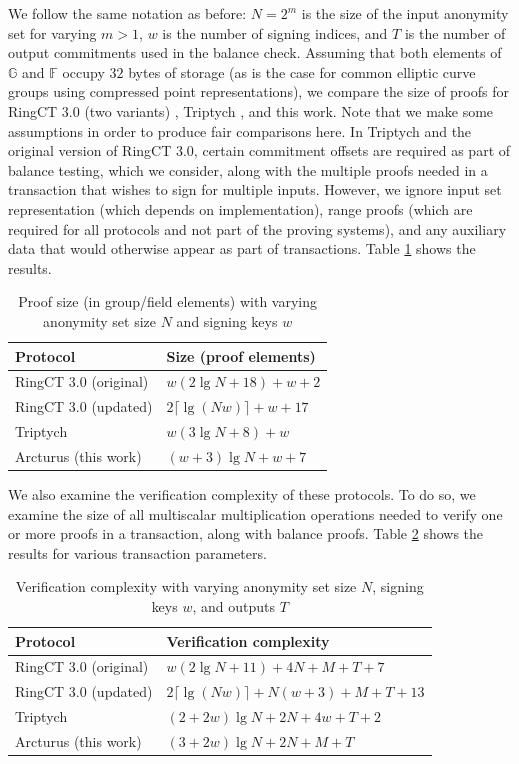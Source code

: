 \documentclass{article}
\newcommand{\G}{\mathbb{G}}
\newcommand{\F}{\mathbb{F}}
\theoremstyle{definition}
\begin{document}
We follow the same notation as before: $N = 2^m$ is the size of the input anonymity set for varying $m > 1$, $w$ is the number of signing indices, and $T$ is the number of output commitments used in the balance check.
Assuming that both elements of $\G$ and $\F$ occupy $32$ bytes of storage (as is the case for common elliptic curve groups using compressed point representations), we compare the size of proofs for RingCT 3.0 (two variants) \cite{rct3}, Triptych \cite{triptych}, and this work.
Note that we make some assumptions in order to produce fair comparisons here.
In Triptych and the original version of RingCT 3.0, certain commitment offsets are required as part of balance testing, which we consider, along with the multiple proofs needed in a transaction that wishes to sign for multiple inputs.
However, we ignore input set representation (which depends on implementation), range proofs (which are required for all protocols and not part of the proving systems), and any auxiliary data that would otherwise appear as part of transactions.
Table \ref{table:size} shows the results.

\begin{table}
\centering
\begin{tabular}{|ll|}
\hline
Protocol & Size (proof elements) \\
\hline
RingCT 3.0 (original) \cite{rct3} & $w(2 \lg N + 18) + w + 2$ \\
RingCT 3.0 (updated) \cite{rct3} & $2\lceil \lg(Nw) \rceil + w + 17$ \\
Triptych \cite{triptych} & $w(3 \lg N + 8) + w$ \\
Arcturus (this work) & $(w + 3)\lg N + w + 7$ \\
\hline
\end{tabular}
\caption{Proof size (in group/field elements) with varying anonymity set size $N$ and signing keys $w$}
\label{table:size}
\end{table}

We also examine the verification complexity of these protocols.
To do so, we examine the size of all multiscalar multiplication operations needed to verify one or more proofs in a transaction, along with balance proofs.
Table \ref{table:time} shows the results for various transaction parameters.

\begin{table}
\centering
\begin{tabular}{|ll|}
\hline
Protocol & Verification complexity \\
\hline
RingCT 3.0 (original) \cite{rct3} & $w(2\lg N + 11) + 4N + M + T + 7$ \\
RingCT 3.0 (updated) \cite{rct3} & $2\lceil \lg(Nw) \rceil + N(w + 3) + M + T + 13$ \\
Triptych \cite{triptych} & $(2 + 2w)\lg N + 2N + 4w + T + 2$ \\
Arcturus (this work) & $(3 + 2w)\lg N + 2N + M + T$ \\
\hline
\end{tabular}
\caption{Verification complexity with varying anonymity set size $N$, signing keys $w$, and outputs $T$}
\label{table:time}
\end{table}
\end{document}
